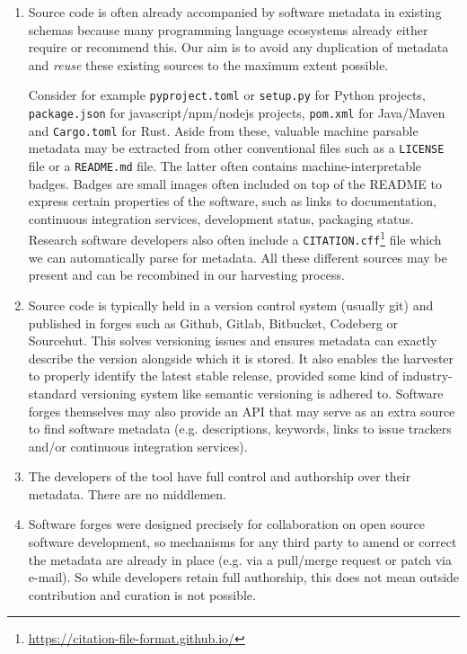 \documentclass[a4paper,11pt]{article}
\begin{document}
\begin{enumerate}

\item
Source code is often already accompanied by software metadata in existing
schemas because many programming language ecosystems already either require or
recommend this. Our aim is to avoid any duplication of metadata and
\emph{reuse} these existing sources to the maximum extent possible.

Consider
for example \texttt{pyproject.toml} or \texttt{setup.py} for Python projects,
\texttt{package.json} for javascript/npm/nodejs projects, \texttt{pom.xml} for
Java/Maven and \texttt{Cargo.toml} for Rust. Aside from these, valuable machine
parsable metadata may be extracted from other conventional files such as a \texttt{LICENSE}
file or a \texttt{README.md} file. The latter often contains machine-interpretable
badges. Badges are small images often included on top of the README to express certain properties of the software, such as links to
documentation, continuous integration services, development status, packaging
status. Research software developers also often include a \texttt{CITATION.cff}\footnote{\url{https://citation-file-format.github.io/}} file which we can automatically parse for metadata. All these different
sources may be present and can be recombined in our harvesting process.

\item 
  Source code 
  is typically held in a version control system (usually git) and published in 
  forges such as Github, Gitlab, Bitbucket, Codeberg or Sourcehut.
  This solves versioning issues and ensures metadata can exactly describe the version alongside which it is stored. It also enables the 
  harvester to properly identify the latest stable release, provided some kind of industry-standard versioning system like semantic versioning is adhered to.
  Software forges themselves may also provide an API that may serve as an extra source to find software metadata (e.g. descriptions, keywords, links to issue trackers and/or continuous integration services).
\item 
  The developers of the tool have full control and authorship over their metadata. There are no middlemen.
\item 
  Software forges were designed precisely for collaboration on open source software development, so mechanisms for any
  third party to amend or correct the metadata are already in place (e.g. via a pull/merge request or patch via e-mail).
  So while developers retain full authorship, this does not mean outside contribution and curation is not possible.
\end{enumerate}
\end{document}
